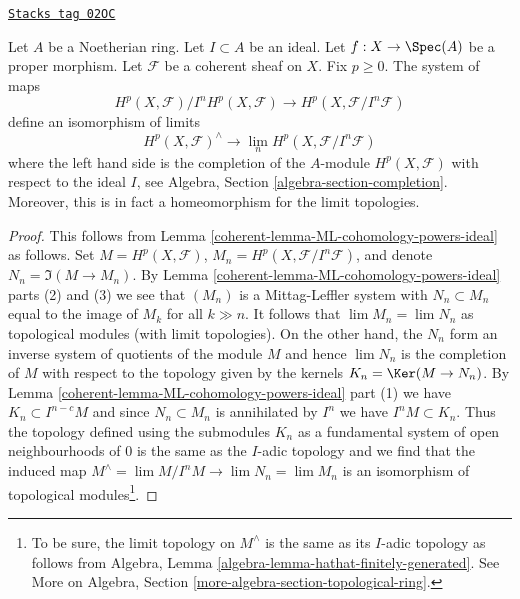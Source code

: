 \begin{theorem}

\label{coherent-theorem-formal-functions}
\href{https://stacks.math.columbia.edu/tag/02OC}{\texttt{Stacks tag 02OC}}

Let $A$ be a Noetherian ring.
Let $I \subset A$ be an ideal.
Let $f : X \to \Spec(A)$ be a proper morphism.
Let $\mathcal{F}$ be a coherent sheaf on $X$.
Fix $p \geq 0$.
The system of maps
$$
H^p(X, \mathcal{F})/I^nH^p(X, \mathcal{F})
\longrightarrow
H^p(X, \mathcal{F}/I^n\mathcal{F})
$$
define an isomorphism of limits
$$
H^p(X, \mathcal{F})^\wedge
\longrightarrow
\lim_n H^p(X, \mathcal{F}/I^n\mathcal{F})
$$
where the left hand side is the completion of the $A$-module
$H^p(X, \mathcal{F})$ with respect to the ideal $I$, see
Algebra, Section \ref{algebra-section-completion}.
Moreover, this is in fact a homeomorphism for the limit topologies.
\end{theorem}

\begin{proof}

This follows from Lemma \ref{coherent-lemma-ML-cohomology-powers-ideal} as follows.
Set $M = H^p(X, \mathcal{F})$, $M_n = H^p(X, \mathcal{F}/I^n\mathcal{F})$,
and denote $N_n = \Im(M \to M_n)$. By
Lemma \ref{coherent-lemma-ML-cohomology-powers-ideal} parts (2) and (3) we see that
$(M_n)$ is a Mittag-Leffler system with
$N_n \subset M_n$ equal to the image of $M_k$ for all $k \gg n$.
It follows that $\lim M_n = \lim N_n$ as topological modules (with limit
topologies). On the other hand, the $N_n$ form an inverse system of quotients
of the module $M$ and hence $\lim N_n$ is the completion of $M$
with respect to the topology given by the kernels $K_n = \Ker(M \to N_n)$.
By Lemma \ref{coherent-lemma-ML-cohomology-powers-ideal} part (1)
we have $K_n \subset I^{n - c}M$ and since $N_n \subset M_n$
is annihilated by $I^n$ we have $I^n M \subset K_n$.
Thus the topology defined using the submodules $K_n$
as a fundamental system of open neighbourhoods of $0$
is the same as the $I$-adic topology and we find that the
induced map $M^\wedge = \lim M/I^nM \to \lim N_n = \lim M_n$
is an isomorphism of topological modules\footnote{
To be sure, the limit topology on $M^\wedge$ is the same as its
$I$-adic topology as follows from
Algebra, Lemma \ref{algebra-lemma-hathat-finitely-generated}.
See More on Algebra, Section \ref{more-algebra-section-topological-ring}.}.
\end{proof}

